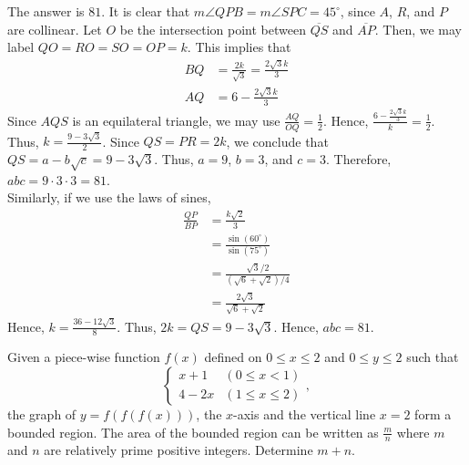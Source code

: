 \begin{solution}
The answer is $81$. It is clear that $m\angle QPB = m \angle SPC = 45^\circ$, since $A$, $R$, and $P$ are collinear. Let $O$ be the intersection point between $\overline{QS}$ and $\overline{AP}$. Then, we may label $QO=RO=SO=OP=k$. This implies that 
\begin{align*}
	BQ&=\frac{2k}{\sqrt{3}}=\frac{2\sqrt{3}k}{3}\\
	AQ&=6-\frac{2\sqrt{3}k}{3}
\end{align*}
Since $AQS$ is an equilateral triangle, we may use $\frac{AQ}{OQ}=\frac{1}{2}$. Hence, $\frac{6-\frac{2\sqrt{3}k}{3}}{k}=\frac{1}{2}$. Thus, $k=\frac{9-3\sqrt{3}}{2}$. Since $QS=PR=2k$, we conclude that $QS=a-b\sqrt{c}=9-3\sqrt{3}$. Thus, $a=9$, $b=3$, and $c=3$. Therefore, $abc=9\cdot3\cdot3=81$.\\
\bigskip
Similarly, if we use the laws of sines, 
\begin{align*}
	\frac{QP}{BP}&=\frac{k\sqrt{2}}{3}\\
	&=\frac{\sin(60^\circ)}{\sin(75^\circ)}\\
	&=\frac{\sqrt{3}/2}{(\sqrt{6}+\sqrt{2})/4}\\
	&=\frac{2\sqrt{3}}{\sqrt{6}+\sqrt{2}}
\end{align*}
Hence, $k=\frac{36-12\sqrt{3}}{8}$. Thus, $2k=QS=9-3\sqrt{3}$. Hence, $abc=81$.
\end{solution}

\begin{problem}
Given a piece-wise function $f(x)$ defined on $0\leq x \leq 2$ and $0\leq y \leq 2$ such that
$$\begin{cases} x+1 & (0\leq x < 1) \\ 4-2x & (1\leq x \leq 2) \end{cases},$$ the graph of $y=f(f(f(x)))$, the $x$-axis and the vertical line $x=2$ form a bounded region. The area of the bounded region can be written as $\frac{m}{n}$ where $m$ and $n$ are relatively prime positive integers. Determine $m+n$.
\end{problem}

